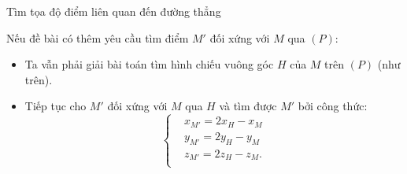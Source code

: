 \begin{dang}{Tìm tọa độ điểm liên quan đến đường thẳng}
\begin{enumerate}
\begin{center}
	\end{center}
	\begin{note}
		Nếu đề bài có thêm yêu cầu tìm điểm $M'$ đối xứng với $M$ qua $(P)$:
		\begin{itemize}
			\item  Ta vẫn phải giải bài toán tìm hình chiếu vuông góc $H$ của $M$ trên $(P)$ (như trên).
			\item Tiếp tục cho $M'$ đối xứng với $M$ qua $H$ và tìm được $M'$ bởi công thức: $$ \left\{\begin{aligned}
			&x_{M'}=2x_H-x_M\\
			&y_{M'}=2y_H-y_M\\
			&z_{M'}=2z_H-z_M.\\
			\end{aligned}\right.$$
		\end{itemize}
	\end{note}
\end{enumerate}
	\end{dang}
\setcounter{subsubsection}{0}
\setcounter{vd}{0}
\setcounter{ex}{0}
